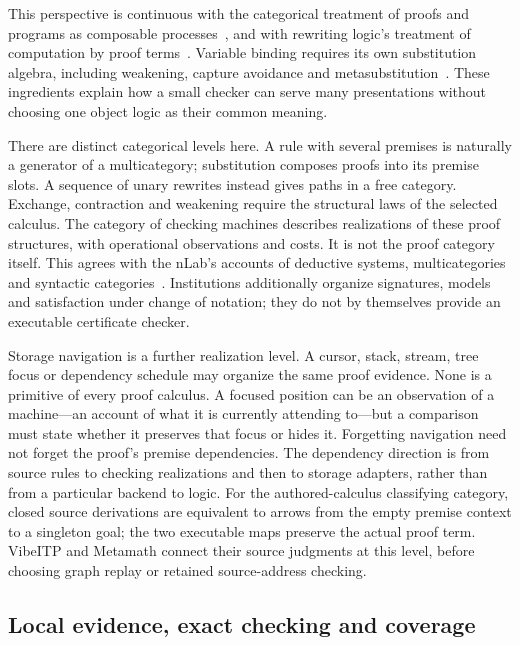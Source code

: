 \documentclass[11pt,a4paper]{article}
\begin{document}
This perspective is continuous with the categorical treatment of proofs and
programs as composable processes~\cite{RosettaStone}, and with rewriting
logic's treatment of computation by proof terms~\cite{RewritingLogic}.
Variable binding requires its own substitution algebra, including weakening,
capture avoidance and metasubstitution~\cite{SecondOrderMetatheory}. These
ingredients explain how a small checker can serve many presentations without
choosing one object logic as their common meaning.

There are distinct categorical levels here. A rule with several premises is
naturally a generator of a multicategory; substitution composes proofs into
its premise slots. A sequence of unary rewrites instead gives paths in a
free category. Exchange, contraction and weakening require the structural
laws of the selected calculus. The category of checking machines describes
realizations of these proof structures, with operational observations and
costs. It is not the proof category itself. This agrees with the nLab's
accounts of deductive systems, multicategories and syntactic
categories~\cite{nLabInference}. Institutions additionally organize signatures,
models and satisfaction under change of notation; they do not by themselves
provide an executable certificate checker.

Storage navigation is a further realization level. A cursor, stack, stream,
tree focus or dependency schedule may organize the same proof evidence.
None is a primitive of every proof calculus. A focused position can be an
observation of a machine---an account of what it is currently attending
to---but a comparison must state whether it preserves that focus or hides
it. Forgetting navigation need not forget the proof's premise dependencies.
The dependency direction is from source rules to checking realizations and
then to storage adapters, rather than from a particular backend to logic.
For the authored-calculus classifying category, closed source derivations
are equivalent to arrows from the empty premise context to a singleton goal;
the two executable maps preserve the actual proof term. VibeITP and Metamath
connect their source judgments at this level, before choosing graph replay
or retained source-address checking.

\subsection{Local evidence, exact checking and coverage}
\end{document}
